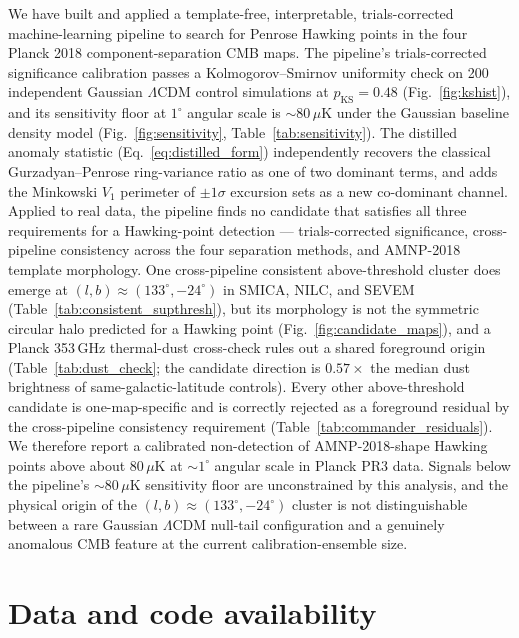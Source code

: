 \documentclass[11pt,a4paper]{article}
\begin{document}
We have built and applied a template-free, interpretable, trials-corrected machine-learning pipeline to search for Penrose Hawking points in the four Planck 2018 component-separation CMB maps. The pipeline's trials-corrected significance calibration passes a Kolmogorov--Smirnov uniformity check on 200 independent Gaussian $\Lambda$CDM control simulations at $p_{\text{KS}} = 0.48$ (Fig.~\ref{fig:kshist}), and its sensitivity floor at $1^\circ$ angular scale is $\sim 80\,\mu\mathrm{K}$ under the Gaussian baseline density model (Fig.~\ref{fig:sensitivity}, Table~\ref{tab:sensitivity}). The distilled anomaly statistic (Eq.~\ref{eq:distilled_form}) independently recovers the classical Gurzadyan--Penrose ring-variance ratio as one of two dominant terms, and adds the Minkowski $V_1$ perimeter of $\pm 1\sigma$ excursion sets as a new co-dominant channel. Applied to real data, the pipeline finds no candidate that satisfies all three requirements for a Hawking-point detection --- trials-corrected significance, cross-pipeline consistency across the four separation methods, and AMNP-2018 template morphology. One cross-pipeline consistent above-threshold cluster does emerge at $(l, b) \approx (133^\circ, -24^\circ)$ in SMICA, NILC, and SEVEM (Table~\ref{tab:consistent_supthresh}), but its morphology is not the symmetric circular halo predicted for a Hawking point (Fig.~\ref{fig:candidate_maps}), and a Planck 353\,GHz thermal-dust cross-check rules out a shared foreground origin (Table~\ref{tab:dust_check}; the candidate direction is $0.57 \times$ the median dust brightness of same-galactic-latitude controls). Every other above-threshold candidate is one-map-specific and is correctly rejected as a foreground residual by the cross-pipeline consistency requirement (Table~\ref{tab:commander_residuals}). We therefore report a calibrated non-detection of AMNP-2018-shape Hawking points above about $80\,\mu\mathrm{K}$ at $\sim 1^\circ$ angular scale in Planck PR3 data. Signals below the pipeline's $\sim 80\,\mu\mathrm{K}$ sensitivity floor are unconstrained by this analysis, and the physical origin of the $(l, b) \approx (133^\circ, -24^\circ)$ cluster is not distinguishable between a rare Gaussian $\Lambda$CDM null-tail configuration and a genuinely anomalous CMB feature at the current calibration-ensemble size.

\section*{Data and code availability}
\end{document}
